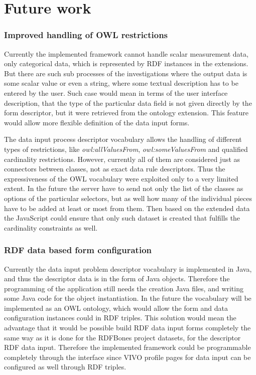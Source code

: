 \section{Future work}

\subsubsection{Improved handling of OWL restrictions}

Currently the implemented framework cannot handle scalar measurement data, only categorical data, which is represented by RDF instances in the extensions. But there are such sub processes of the investigations where the output data is some scalar value or even a string, where some textual description has to be entered by the user. Such case would mean in terms of the user interface description, that the type of the particular data field is not given directly by the form descriptor, but it were retrieved from the ontology extension. This feature would allow more flexible definition of the data input forms.

The data input process descriptor vocabulary allows the handling of different types of restrictions, like \textit{owl:allValuesFrom}, \textit{owl:someValuesFrom} and qualified cardinality restrictions. However, currently all of them are considered just as connectors between classes, not as exact data rule descriptors. Thus the expressiveness of the OWL vocabulary were exploited only to a very limited extent. In the future the server have to send not only the list of the classes as options of the particular selectors, but as well how many of the individual pieces have to be added at least or most from them. Then based on the extended data the JavaScript could ensure that only such dataset is created that fulfills the cardinality constraints as well.

\subsubsection{RDF data based form configuration}

Currently the data input problem descriptor vocabulary is implemented in Java, and thus the descriptor data is in the form of Java objects. Therefore the programming of the application still needs the creation Java files, and writing some Java code for the object instantiation. In the future the vocabulary will be implemented as an OWL ontology, which would allow the form and data configuration instances could in RDF triples. This solution would mean the advantage that it would be possible build RDF data input forms completely the same way as it is done for the RDFBones project datasets, for the descriptor RDF data input. Therefore the implemented framework could be programmable completely through the interface since VIVO profile pages for data input can be configured as well through RDF triples.





